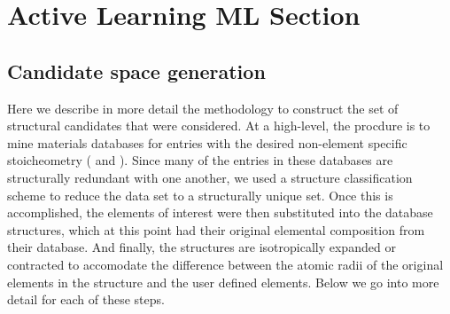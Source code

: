 

\section{Active Learning ML Section}  %
%

\subsection{Candidate space generation}  %
%


%
Here we describe in more detail the methodology to construct the set of structural candidates that were considered.
%
At a high-level, the procdure is to mine materials databases for entries with the desired non-element specific stoicheometry ( \ABtwo and \ABthree).
%
Since many of the entries in these databases are structurally redundant with one another,
we used a structure classification scheme to reduce the data set to a structurally unique set.
%
Once this is accomplished, the elements of interest were then substituted into the database structures, which at this point had their original elemental composition from their database.
%
And finally, the structures are isotropically expanded or contracted to accomodate the difference between the atomic radii of the original elements in the structure and the user defined elements.
%
Below we go into more detail for each of these steps.


